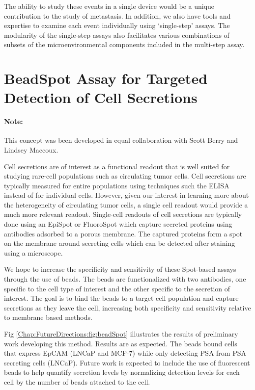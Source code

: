 The ability to study these events in a single device would be a unique contribution to the study of metastasis. In addition, we also have tools and expertise to examine each event individually using `single-step' assays. The modularity of the single-step assays also facilitates various combinations of subsets of the microenvironmental components included in the multi-step assay.

\section{BeadSpot Assay for Targeted Detection of Cell Secretions}

\paragraph{Note:}This concept was been developed in equal collaboration with Scott Berry and Lindsey Maccoux.

Cell secretions are of interest as a functional readout that is well suited for studying rare-cell populations such as circulating tumor cells. Cell secretions are typically measured for entire populations using techniques such the ELISA instead of for individual cells. However, given our interest in learning more about the heterogeneity of circulating tumor cells, a single cell readout would provide a much more relevant readout. Single-cell readouts of cell secretions are typically done using an EpiSpot or FluoroSpot which capture secreted proteins using antibodies adsorbed to a porous membrane. The captured proteins form a spot on the membrane around secreting cells which can be detected after staining using a microscope.

We hope to increase the specificity and sensitivity of these Spot-based assays through the use of beads. The beads are functionalized with two antibodies, one specific to the cell type of interest and the other specific to the secretion of interest. The goal is to bind the beads to a target cell population and capture secretions as they leave the cell, increasing both specificity and sensitivity relative to membrane based methods. 

Fig \ref{Chap:FutureDirections:fig:beadSpot} illustrates the results of preliminary work developing this method. Results are as expected. The beads bound cells that express EpCAM (LNCaP and MCF-7) while only detecting PSA from PSA secreting cells (LNCaP). Future work is expected to include the use of fluorescent beads to help quantify secretion levels by normalizing detection levels for each cell by the number of beads attached to the cell.

